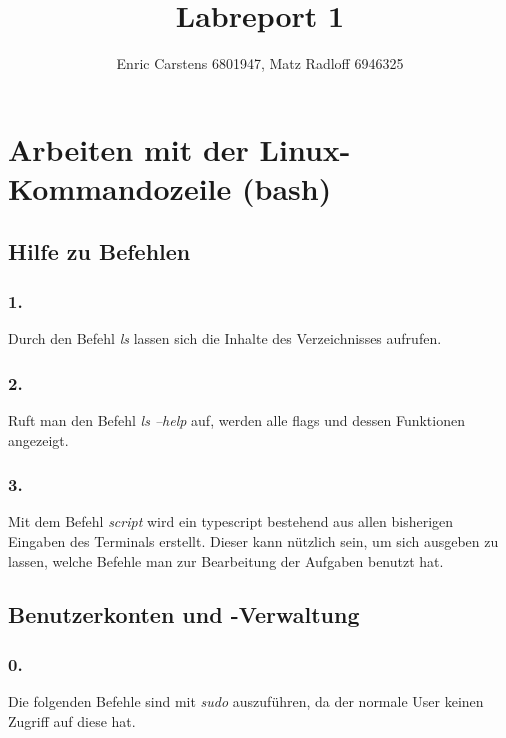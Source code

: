 \documentclass[
    fontsize=10pt,
    headings=medium,
    parskip=half,           %
    bibliography=totoc,
    numbers=noenddot,       %
    open=any,               %
    a4paper,
    ]{scrreprt}
\title{Labreport 1}
\author{Enric Carstens 6801947, Matz Radloff 6946325}
\begin{document}
\begin{titlepage}

\begin{center}\Large
    \vfill
    \makeatletter
    {\Large\textsf{\textbf{\@title}}\par}
    \makeatother
    \bigskip
    \makeatletter
    {\@author} \par
    \makeatother
    \bigskip
    \makeatletter
    {\@date}
    \makeatother
    \vfill
    \vfill
\end{center}

\end{titlepage}

\chapter{Arbeiten mit der Linux-Kommandozeile (bash)}

\section{Hilfe zu Befehlen}

\subsection*{1.}
Durch den Befehl \emph{ls} lassen sich die Inhalte des Verzeichnisses aufrufen.

\subsection*{2.}
Ruft man den Befehl \emph{ls --help} auf, werden alle flags und dessen Funktionen angezeigt.

\subsection*{3.}
Mit dem Befehl \emph{script} wird ein typescript bestehend aus allen bisherigen Eingaben des Terminals erstellt. Dieser kann nützlich sein, um sich ausgeben zu lassen, welche Befehle man zur Bearbeitung der Aufgaben benutzt hat.


\section{Benutzerkonten und -Verwaltung}
\subsection*{0.}
Die folgenden Befehle sind mit \emph{sudo} auszuführen, da der normale User keinen Zugriff auf diese hat.
\end{document}
